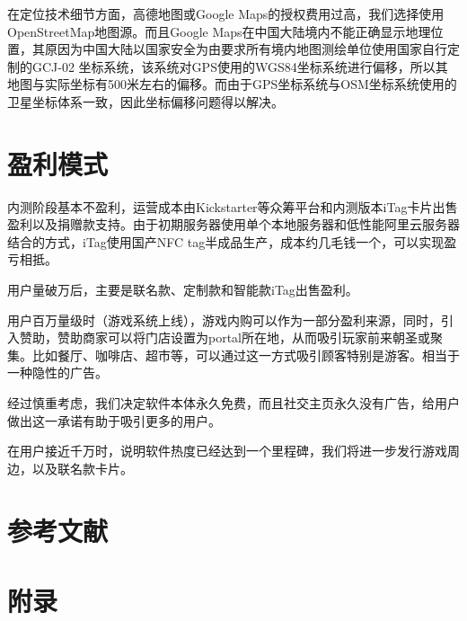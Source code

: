 \documentclass[UTF8]{ctexart}
\begin{document}
在定位技术细节方面，高德地图或Google Maps的授权费用过高，我们选择使用OpenStreetMap地图源。而且Google Maps在中国大陆境内不能正确显示地理位置，其原因为中国大陆以国家安全为由要求所有境内地图测绘单位使用国家自行定制的GCJ-02 坐标系统，该系统对GPS使用的WGS84坐标系统进行偏移，所以其地图与实际坐标有500米左右的偏移。而由于GPS坐标系统与OSM坐标系统使用的卫星坐标体系一致，因此坐标偏移问题得以解决。

\section{盈利模式}

内测阶段基本不盈利，运营成本由Kickstarter等众筹平台和内测版本iTag卡片出售盈利以及捐赠款支持。由于初期服务器使用单个本地服务器和低性能阿里云服务器结合的方式，iTag使用国产NFC tag半成品生产，成本约几毛钱一个，可以实现盈亏相抵。

用户量破万后，主要是联名款、定制款和智能款iTag出售盈利。

用户百万量级时（游戏系统上线），游戏内购可以作为一部分盈利来源，同时，引入赞助，赞助商家可以将门店设置为portal所在地，从而吸引玩家前来朝圣或聚集。比如餐厅、咖啡店、超市等，可以通过这一方式吸引顾客特别是游客。相当于一种隐性的广告。

经过慎重考虑，我们决定软件本体永久免费，而且社交主页永久没有广告，给用户做出这一承诺有助于吸引更多的用户。

在用户接近千万时，说明软件热度已经达到一个里程碑，我们将进一步发行游戏周边，以及联名款卡片。

\section{参考文献}




\newpage
\section{附录}
\end{document}
